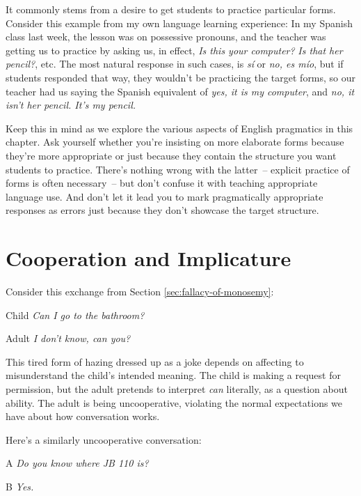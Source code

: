 It commonly stems from a desire to get students to practice particular forms. Consider this example from my own language learning experience: In my Spanish class last week, the lesson was on possessive pronouns, and the teacher was getting us to practice by asking us, in effect, \textit{Is this your computer?} \textit{Is that her pencil?}, etc. The most natural response in such cases, is \textit{sí} or \textit{no, es mío}, but if students responded that way, they wouldn't be practicing the target forms, so our teacher had us saying the Spanish equivalent of \textit{yes, it is my computer}, and \textit{no, it isn't her pencil. It's my pencil.}

Keep this in mind as we explore the various aspects of English pragmatics in this chapter. Ask yourself whether you're insisting on more elaborate forms because they're more appropriate or just because they contain the structure you want students to practice. There's nothing wrong with the latter~-- explicit practice of forms is often necessary~-- but don't confuse it with teaching appropriate language use. And don't let it lead you to mark pragmatically appropriate responses as errors just because they don't showcase the target structure.

\section{Cooperation and Implicature}

Consider this exchange from Section \ref{sec:fallacy-of-monosemy}:

\begin{dialogue}
\item[Child] \textit{Can I go to the bathroom?}
\item[Adult] \textit{I don't know, can you?}
\end{dialogue}

This tired form of hazing dressed up as a joke depends on affecting to misunderstand the child's intended meaning. The child is making a request for permission, but the adult pretends to interpret \textit{can} literally, as a question about ability. The adult is being uncooperative, violating the normal expectations we have about how conversation works.

Here's a similarly uncooperative conversation:

\begin{dialogue}
\item[A] \textit{Do you know where JB 110 is?}
\item[B] \textit{Yes.}
\end{dialogue}

